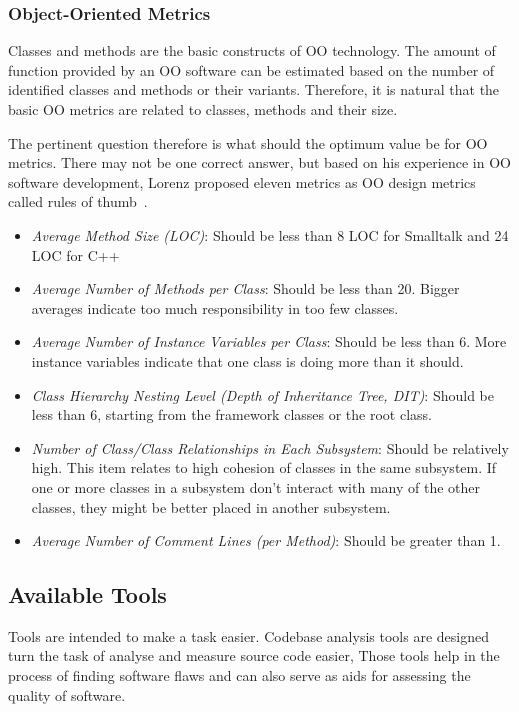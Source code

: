 \subsubsection{Object-Oriented Metrics}
Classes and methods are the basic constructs of OO technology.
The amount of function provided by an OO software can be estimated based on the number of identified classes and methods or their variants.
Therefore, it is natural that the basic OO metrics are related to classes, methods and their size.

The pertinent question therefore is what should the optimum value be for OO metrics. There may not be one correct answer,
but based on his experience in OO software development, Lorenz proposed eleven metrics as OO design metrics called rules of thumb~\cite{lorenz1994object}.
\begin{itemize}
\item \emph{Average Method Size (LOC)}: Should be less than 8 LOC for Smalltalk and 24 LOC for C++
\item \emph{Average Number of Methods per Class}: Should be less than 20. Bigger averages indicate too much responsibility in too few classes.
\item \emph{Average Number of Instance Variables per Class}: Should be less than 6. More instance variables indicate that one class is doing more than it should.
\item \emph{Class Hierarchy Nesting Level (Depth of Inheritance Tree, DIT)}: Should be less than 6, starting from the framework classes or the root class.
\item \emph{Number of Class/Class Relationships in Each Subsystem}: Should be relatively high. This item relates to high cohesion of classes in the same subsystem. If one or more classes in a subsystem don't interact with many of the other classes, they might be better placed in another subsystem.
\item \emph{Average Number of Comment Lines (per Method)}: Should be greater than 1.
\end{itemize}




\subsection{Available Tools}
Tools are intended to make a task easier.
Codebase analysis tools are designed turn the task of analyse and measure source code easier,
Those tools help in the process of finding software flaws and can also serve as aids for assessing the quality of software.

